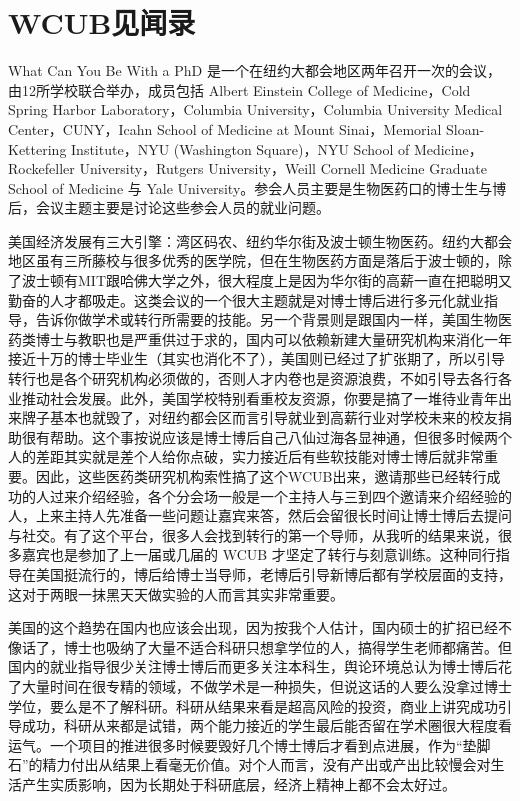\documentclass[]{book}
\begin{document}
\hypertarget{wcubux89c1ux95fbux5f55}{%
\section{WCUB见闻录}\label{wcubux89c1ux95fbux5f55}}

What Can You Be With a PhD 是一个在纽约大都会地区两年召开一次的会议，由12所学校联合举办，成员包括 Albert Einstein College of Medicine，Cold Spring Harbor Laboratory，Columbia University，Columbia University Medical Center，CUNY，Icahn School of Medicine at Mount Sinai，Memorial Sloan- Kettering Institute，NYU (Washington Square)，NYU School of Medicine，Rockefeller University，Rutgers University，Weill Cornell Medicine Graduate School of Medicine 与 Yale University。参会人员主要是生物医药口的博士生与博后，会议主题主要是讨论这些参会人员的就业问题。

美国经济发展有三大引擎：湾区码农、纽约华尔街及波士顿生物医药。纽约大都会地区虽有三所藤校与很多优秀的医学院，但在生物医药方面是落后于波士顿的，除了波士顿有MIT跟哈佛大学之外，很大程度上是因为华尔街的高薪一直在把聪明又勤奋的人才都吸走。这类会议的一个很大主题就是对博士博后进行多元化就业指导，告诉你做学术或转行所需要的技能。另一个背景则是跟国内一样，美国生物医药类博士与教职也是严重供过于求的，国内可以依赖新建大量研究机构来消化一年接近十万的博士毕业生（其实也消化不了），美国则已经过了扩张期了，所以引导转行也是各个研究机构必须做的，否则人才内卷也是资源浪费，不如引导去各行各业推动社会发展。此外，美国学校特别看重校友资源，你要是搞了一堆待业青年出来牌子基本也就毁了，对纽约都会区而言引导就业到高薪行业对学校未来的校友捐助很有帮助。这个事按说应该是博士博后自己八仙过海各显神通，但很多时候两个人的差距其实就是差个人给你点破，实力接近后有些软技能对博士博后就非常重要。因此，这些医药类研究机构索性搞了这个WCUB出来，邀请那些已经转行成功的人过来介绍经验，各个分会场一般是一个主持人与三到四个邀请来介绍经验的人，上来主持人先准备一些问题让嘉宾来答，然后会留很长时间让博士博后去提问与社交。有了这个平台，很多人会找到转行的第一个导师，从我听的结果来说，很多嘉宾也是参加了上一届或几届的 WCUB 才坚定了转行与刻意训练。这种同行指导在美国挺流行的，博后给博士当导师，老博后引导新博后都有学校层面的支持，这对于两眼一抹黑天天做实验的人而言其实非常重要。

美国的这个趋势在国内也应该会出现，因为按我个人估计，国内硕士的扩招已经不像话了，博士也吸纳了大量不适合科研只想拿学位的人，搞得学生老师都痛苦。但国内的就业指导很少关注博士博后而更多关注本科生，舆论环境总认为博士博后花了大量时间在很专精的领域，不做学术是一种损失，但说这话的人要么没拿过博士学位，要么是不了解科研。科研从结果来看是超高风险的投资，商业上讲究成功引导成功，科研从来都是试错，两个能力接近的学生最后能否留在学术圈很大程度看运气。一个项目的推进很多时候要毁好几个博士博后才看到点进展，作为``垫脚石''的精力付出从结果上看毫无价值。对个人而言，没有产出或产出比较慢会对生活产生实质影响，因为长期处于科研底层，经济上精神上都不会太好过。
\end{document}
